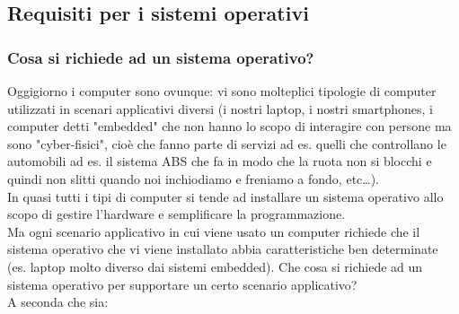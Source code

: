 \subsection{Requisiti per i sistemi operativi}
\subsubsection{Cosa si richiede ad un sistema operativo?}
Oggigiorno i computer sono ovunque: vi sono molteplici tipologie di computer utilizzati in scenari applicativi diversi (i nostri laptop, i nostri smartphones, i computer detti "embedded" che non hanno lo scopo di interagire con persone ma sono "cyber-fisici", cioè che fanno parte di servizi ad es. quelli che controllano le automobili ad es. il sistema ABS che fa in modo che la ruota non si blocchi e quindi non slitti quando noi inchiodiamo e freniamo a fondo, etc\dots).\\
In quasi tutti i tipi di computer si tende ad installare un sistema operativo allo scopo di gestire l'hardware e semplificare la programmazione.\\
Ma ogni scenario applicativo in cui viene usato un computer richiede che il sistema operativo che vi viene installato abbia caratteristiche ben determinate (es. laptop molto diverso dai sistemi embedded). Che cosa si richiede ad un sistema operativo per supportare un certo scenario applicativo?\\
A seconda che sia: 
